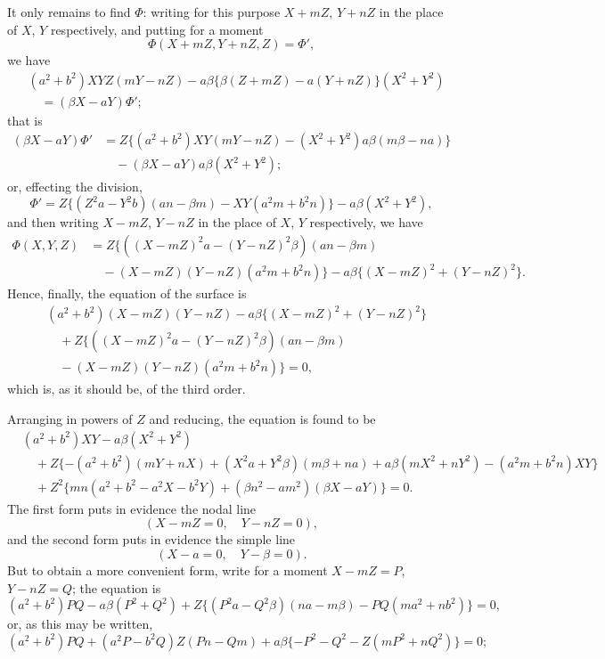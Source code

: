 \documentclass[11pt,a4paper]{article}
\theoremstyle{plain}
\begin{document}
\newpage
It only remains to find $\Phi$: writing for this purpose $X + mZ$, $Y + nZ$ in the place of $X$, $Y$ respectively, and putting for a moment
\[
\Phi(X + mZ, Y + nZ, Z) = \Phi',
\]
we have
\begin{align*}
&(a^2 + b^2)XYZ(mY - nZ) - a\beta\{\beta(Z + mZ) - a(Y + nZ)\}(X^2 + Y^2) \\
&\quad = (\beta X - aY)\Phi';
\end{align*}
that is
\begin{align*}
(\beta X - aY)\Phi' &= Z\{(a^2 + b^2)XY(mY - nZ) - (X^2 + Y^2)a\beta(m\beta - na)\} \\
&\quad - (\beta X - aY)a\beta(X^2 + Y^2);
\end{align*}
or, effecting the division,
\[
\Phi' = Z\{(Z^2a - Y^2b)(an - \beta m) - XY(a^2m + b^2n)\} - a\beta(X^2 + Y^2),
\]
and then writing $X - mZ$, $Y - nZ$ in the place of $X$, $Y$ respectively, we have
\begin{align*}
\Phi(X, Y, Z) &= Z\{((X - mZ)^2a - (Y - nZ)^2\beta)(an - \beta m) \\
&\quad - (X - mZ)(Y - nZ)(a^2m + b^2n)\} - a\beta\{(X - mZ)^2 + (Y - nZ)^2\}.
\end{align*}
Hence, finally, the equation of the surface is
\begin{align*}
&(a^2 + b^2)(X - mZ)(Y - nZ) - a\beta\{(X - mZ)^2 + (Y - nZ)^2\} \\
&\quad + Z\{((X - mZ)^2a - (Y - nZ)^2\beta)(an - \beta m) \\
&\quad - (X - mZ)(Y - nZ)(a^2m + b^2n)\} = 0,
\end{align*}
which is, as it should be, of the third order.

Arranging in powers of $Z$ and reducing, the equation is found to be
\begin{align*}
&(a^2 + b^2)XY - a\beta(X^2 + Y^2) \\
&\quad + Z\{-(a^2 + b^2)(mY + nX) + (X^2a + Y^2\beta)(m\beta + na) + a\beta(mX^2 + nY^2) - (a^2m + b^2n)XY\} \\
&\quad + Z^2\{mn(a^2 + b^2 - a^2X - b^2Y) + (\beta n^2 - am^2)(\beta X - aY)\} = 0.
\end{align*}
The first form puts in evidence the nodal line
\[
(X - mZ = 0, \quad Y - nZ = 0),
\]
and the second form puts in evidence the simple line
\[
(X - a = 0, \quad Y - \beta = 0).
\]
But to obtain a more convenient form, write for a moment $X - mZ = P$, $Y - nZ = Q$; the equation is
\[
(a^2 + b^2)PQ - a\beta(P^2 + Q^2) + Z\{(P^2a - Q^2\beta)(na - m\beta) - PQ(ma^2 + nb^2)\} = 0,
\]
or, as this may be written,
\[
(a^2 + b^2)PQ + (a^2P - b^2Q)Z(Pn - Qm) + a\beta\{-P^2 - Q^2 - Z(mP^2 + nQ^2)\} = 0;
\]
\end{document}
